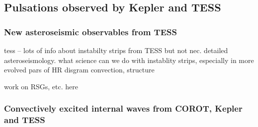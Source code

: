 {\color{blue}
\subsection{Pulsations observed by Kepler and TESS}



\subsubsection{New asteroseismic observables from TESS}

tess -- lots of info about instabilty strips from TESS but not nec. detailed asteroseismology.  what science can we do with instablity strips, especially in more evolved pars of HR disgram  convection, structure

work on RSGs, etc. here

\subsubsection{Convectively excited internal waves from COROT, Kepler and TESS}


}